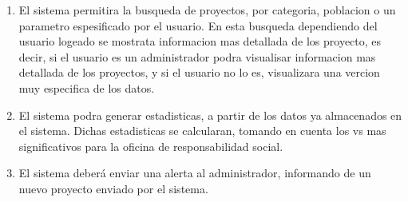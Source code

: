 \documentclass[journal]{IEEEtran}
\begin{document}
\begin{enumerate}
\item
El sistema permitira la busqueda de proyectos, por categoria, poblacion o un parametro espesificado por el usuario. En esta busqueda dependiendo del usuario logeado se mostrata informacion mas detallada de los proyecto, es decir, si el usuario es un administrador podra visualisar informacion mas detallada de los proyectos, y si el usuario no lo es, visualizara una vercion muy especifica de los datos.\\
\item
El sistema podra generar estadisticas, a partir de los datos ya almacenados en el sistema. Dichas estadisticas se calcularan, tomando en cuenta los vs mas significativos para la oficina de responsabilidad social.\\ 
\item
El sistema deberá enviar una alerta al administrador, informando de
un nuevo proyecto enviado por el sistema.
\end{enumerate}
\end{document}

